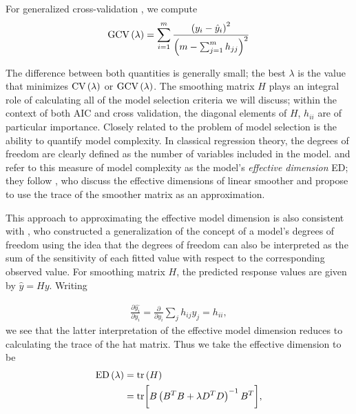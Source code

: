 \documentclass[12pt]{article}
\theoremstyle{definition}
\begin{document}
For generalized cross-validation \cite{wahba1990spline}, we compute 
\begin{equation} \label{eq:GCV_def}
\textup{GCV}\left(\lambda\right) = \sum_{i=1}^m \frac{\left(  y_i - \hat{y}_i \right)^2}{\left(m-\sum_{j=1}^m h_{jj}\right)^2} 
\end{equation}

The difference between both quantities is generally small; the best $\lambda$ is the value that minimizes $\textup{CV}\left(\lambda\right)$ or $\textup{GCV}\left(\lambda\right)$. 
The smoothing matrix $H$ plays an integral role of calculating all of the model selection criteria we will discuss; within the context of both AIC and cross validation, the diagonal elements of $H$, $h_{ii}$ are of particular importance. Closely related to the problem of model selection is the ability to quantify model complexity. In classical regression theory, the degrees of freedom are clearly defined as the number of variables included in the model. \cite{eilers1996flexible} and\cite{marx2005multidimensional} refer to this measure of model complexity as the model's \emph{effective dimension} ED; they follow \cite{hastie1990generalized}, who discuss the effective dimensions of linear smoother and propose to use the trace of the smoother matrix as an approximation.

This approach to approximating the effective model dimension is also consistent with \cite{ye1998measuring}, who constructed a generalization of the concept of a model's degrees of freedom using the idea that the degrees of freedom can also be interpreted as the sum of the sensitivity of each fitted value with respect to the corresponding observed value.  For smoothing matrix $H$, the predicted response values are given by $\hat{y} = H y$. Writing

\begin{align*}
\frac{\partial \hat{y_i}}{\partial y_i} = \frac{\partial }{\partial y_i} \sum_{j} h_{ij} y_j = h_{ii},
\end{align*}
\noindent
we see that the latter interpretation of the effective model dimension reduces to calculating the trace of the hat matrix. Thus we take the effective dimension to be 
\begin{align}
\textup{ED}\left(\lambda\right) &= \textup{tr}\left(H\right) \nonumber \\
&= \textup{tr}\bigg[ B\left( B^T B + \lambda D^T D \right)^{-1} B^T\bigg], \label{eq:hat_matrix_trace}
\end{align}
\end{document}
